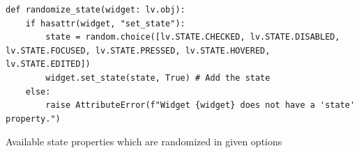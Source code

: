 \documentclass[Bachelor, BIC, english, fhCitStyle, IEEE]{BASE/twbook} %
\begin{document}
\begin{listing}[htbp]
    \begin{verbatim}
def randomize_state(widget: lv.obj):
    if hasattr(widget, "set_state"):
        state = random.choice([lv.STATE.CHECKED, lv.STATE.DISABLED, lv.STATE.FOCUSED, lv.STATE.PRESSED, lv.STATE.HOVERED, lv.STATE.EDITED])
        widget.set_state(state, True) # Add the state
    else:
        raise AttributeError(f"Widget {widget} does not have a 'state' property.")
    \end{verbatim}
    \caption{Available state properties which are randomized in given options}
    \label{code:randomized-state}
\end{listing}
\end{document}
